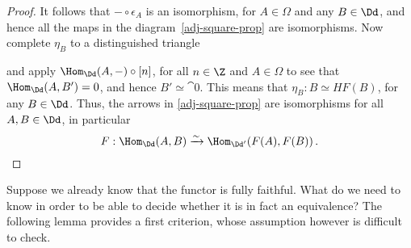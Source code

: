 \begin{prop}
\begin{proof}
        It follows that $- \circ \epsilon_{A}$ is an isomorphism,
        for $A \in \Omega$ and any $B \in \Dd$, and hence all the maps 
        in the diagram~\eqref{adj-square-prop} are isomorphisms.
        Now complete $\eta_{B}$ to a distinguished triangle
        \begin{center}
        \end{center}
        and apply $\Hom_{\Dd}(A,-) \circ [n]$, 
        for all $n \in \Z$ and $A \in \Omega$
        to see that $\Hom_{\Dd}(A,B') = 0$, and hence $B' \simeq \cat{0}$.
        This means that $\eta_{B}:B \simeq HF(B)$, for any $B \in \Dd$. 
        Thus, the arrows in \eqref{adj-square-prop} are isomorphisms
        for all $A,B \in \Dd$, in particular
        \begin{equation*}
            F:\Hom_{\Dd}(A,B) \xrightarrow[]{\sim} \Hom_{\Dd'}(F(A),F(B))\,.
        \end{equation*}
    \end{proof}
\end{prop}

Suppose we already know that the functor is fully faithful. 
What do we need to know in order to be able to decide whether 
it is in fact an equivalence? 
The following lemma provides a first criterion, 
whose assumption however is difficult to check. 

